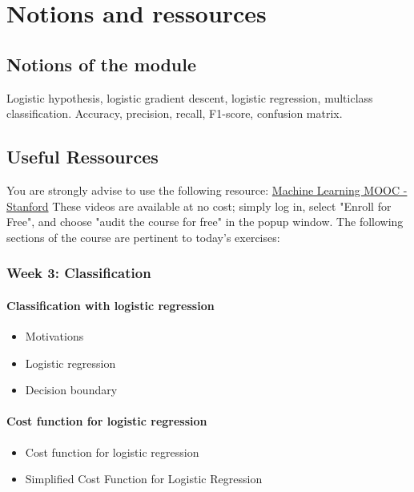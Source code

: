 

\chapter*{Notions and ressources}

\section*{Notions of the module}
Logistic hypothesis, logistic gradient descent, logistic regression, multiclass classification. 
Accuracy, precision, recall, F1-score, confusion matrix.

\section*{Useful Ressources}

You are strongly advise to use the following resource:
\href{https://www.coursera.org/learn/machine-learning}{Machine Learning MOOC - Stanford}
These videos are available at no cost; simply log in, select "Enroll for Free", and choose "audit the course for free" in the popup window.
The following sections of the course are pertinent to today's exercises:

\subsection*{Week 3: Classification}

\subsubsection*{Classification with logistic regression}
\begin{itemize}
  \item Motivations
  \item Logistic regression
  \item Decision boundary
\end{itemize}

\subsubsection*{Cost function for logistic regression}
\begin{itemize}
  \item Cost function for logistic regression
  \item Simplified Cost Function for Logistic Regression
\end{itemize}

